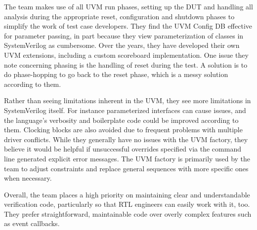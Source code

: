 \documentclass[11pt,a4paper]{report}
\begin{document}
The team makes use of all UVM run phases, setting up the DUT and handling all analysis during the appropriate reset,
configuration and shutdown phases to simplify the work of test case developers. They find the UVM Config DB effective
for parameter passing, in part because they view parameterization of classes in SystemVerilog as cumbersome. Over the
years, they have developed their own UVM extensions, including a custom scoreboard implementation. One issue they
note concerning phasing is the handling of reset during the test. A solution is to do phase-hopping to go back to the
reset phase, which is a messy solution according to them.

Rather than seeing limitations inherent in the UVM, they see more limitations in SystemVerilog itself. For instance
parameterized interfaces can cause issues, and the language's verbosity and boilerplate code could be improved
according to them. Clocking blocks are also avoided due to frequent problems with multiple driver conflicts. While
they generally have no issues with the UVM factory, they believe it would be helpful if unsuccessful overrides
specified via the command line generated explicit error messages. The UVM factory is primarily used by the team to
adjust constraints and replace general sequences with more specific ones when necessary.

Overall, the team places a high priority on maintaining clear and understandable verification code, particularly so
that RTL engineers can easily work with it, too. They prefer straightforward, maintainable code over overly complex
features such as event callbacks.
\end{document}
